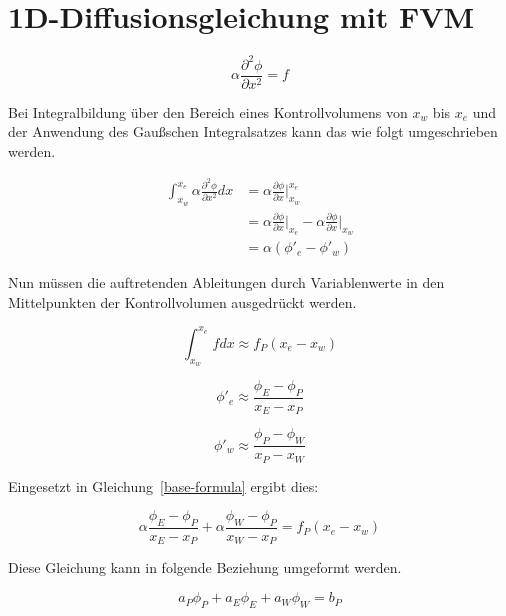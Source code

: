 \documentclass[10pt, ngerman,colorback,accentcolor=tud2d]{tudreport}
\begin{document}
\chapter{1D-Diffusionsgleichung mit FVM}

\begin{equation} \label{base-formula}
\alpha \frac{\partial^2 \phi}{\partial x^2} = f
\end{equation}

Bei Integralbildung über den Bereich eines Kontrollvolumens von $x_w$ bis $x_e$
und der Anwendung des Gaußschen Integralsatzes kann das wie folgt umgeschrieben werden.

\begin{align*}
\int_{x_w}^{x_e}\alpha \frac{\partial^2 \phi}{\partial x^2} dx
&= \alpha \frac{\partial \phi}{\partial x}\Big|_{x_w}^{x_e}\\
&= \alpha \frac{\partial \phi}{\partial x}\Big|_{x_e}
 - \alpha \frac{\partial \phi}{\partial x}\Big|_{x_w}\\
&= \alpha (\phi'_e - \phi'_w)
\end{align*}

Nun müssen die auftretenden Ableitungen durch Variablenwerte in den Mittelpunkten
der Kontrollvolumen ausgedrückt werden.

\begin{equation*}
\int_{x_w}^{x_e}f dx \approx f_P (x_e - x_w)
\end{equation*}

\begin{equation*}
\phi'_e \approx \frac{\phi_E - \phi_P}{x_E - x_P}
\end{equation*}

\begin{equation*}
\phi'_w \approx \frac{\phi_P - \phi_W}{x_P - x_W}
\end{equation*}

Eingesetzt in Gleichung~\ref{base-formula} ergibt dies:

\begin{equation}
\alpha \frac{\phi_E - \phi_P}{x_E - x_P} + \alpha \frac{\phi_W - \phi_P}{x_W - x_P}
= f_P (x_e - x_w)
\end{equation}

Diese Gleichung kann in folgende Beziehung umgeformt werden.

\newcommand{\diffEP}{(x_E-x_P)}
\newcommand{\diffWP}{(x_W-x_P)}
\newcommand{\diffew}{(x_e-x_w)}

\begin{equation}
a_P \phi_P + a_E \phi_E + a_W \phi_W = b_P
\end{equation}
\end{document}
